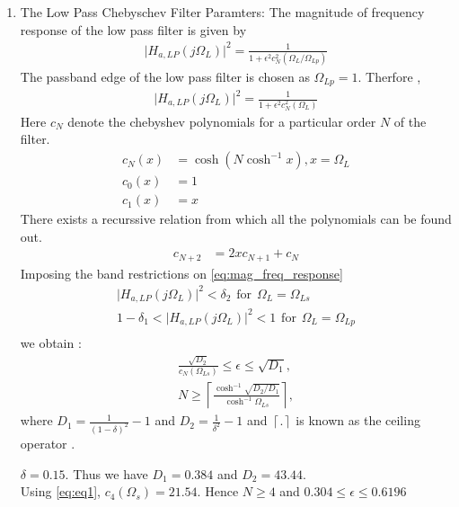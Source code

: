 \documentclass{article}
\begin{document}
\begin{enumerate}
\item {The Low Pass Chebyschev Filter Paramters:} The magnitude of frequency response of the low pass filter is given by 
\begin{align}
    \vert H_{a,LP}(j\Omega_L)\vert^2 = \frac{1}{1 + \epsilon^2c_N^2(\Omega_L/\Omega_{Lp})} \label{eq:mag_freq_response}
\end{align}
The passband edge of the low pass filter is chosen as $\Omega_{Lp}=1$.
Therfore ,
\begin{align}
    \vert H_{a,LP}(j\Omega_L)\vert^2 = \frac{1}{1 + \epsilon^2c_N^2(\Omega_L)} \label{eq:specification}
\end{align}
Here $c_N$ denote the chebyshev polynomials for a particular order $N$ of the filter.
\begin{align}
    c_N(x) &= \cosh(N \cosh^{-1}x) , x=\Omega_{L} \label{eq:eq1}\\
    c_0(x) &= 1 \\
    c_1(x) &= x
\end{align}
There exists a recurssive relation from which all the polynomials can be found out.
\begin{align}
    c_{N+2} &= 2xc_{N+1} + c_{N}  \label{eq:cheby_poly_relation}
\end{align}
Imposing the band restrictions on \eqref{eq:mag_freq_response} \\
\begin{align}
    \vert H_{a,LP}(j\Omega_L)\vert^2 < \delta_{2} \hspace{5pt} \text{for}\hspace{5pt} \Omega_L = \Omega_{Ls}\\
    1-\delta_{1}<\vert H_{a,LP}(j\Omega_L)\vert^2 < 1 \hspace{5pt} \text{for}\hspace{5pt} \Omega_L = \Omega_{Lp}\\
\end{align}
we obtain :
\begin{eqnarray}
\label{lpdesign}
\frac{\sqrt{D_2}}{c_N(\Omega_{Ls})} \leq \epsilon \leq \sqrt{D_1}, \nonumber \\
N \geq \left\lceil \frac{\cosh^{-1}\sqrt{D_2/D_1}}{\cosh^{-1}\Omega_{Ls}} \right\rceil,
\end{eqnarray}
where $D_1 = \frac{1}{(1 - \delta)^2}-1$ and $D_2 = \frac{1}{\delta^2} - 1$ and $\left \lceil . \right \rceil$ is known as the ceiling operator . 

$\delta = 0.15$. Thus we have $D_1 = 0.384$ and $D_2 = 43.44$.\\
Using \eqref{eq:eq1}, $c_4(\Omega_s) = 21.54$.
Hence $N \geq 4$  and $0.304 \leq \epsilon \leq 0.6196$\\



\end{enumerate}
\end{document}
